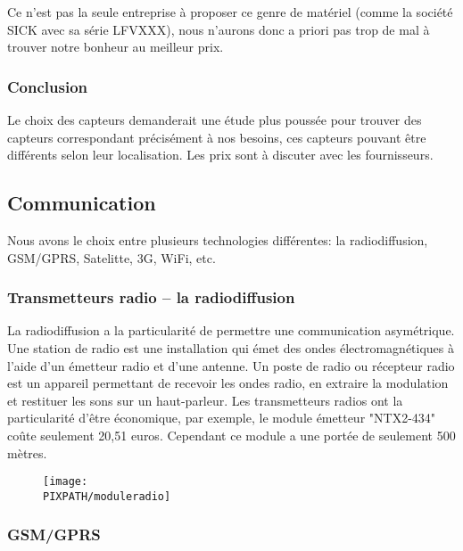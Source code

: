 \FloatBarrier

    Ce n'est pas la seule entreprise à proposer ce genre de matériel (comme la société SICK avec sa série LFVXXX), nous
    n'aurons donc a priori pas trop de mal à trouver notre bonheur au meilleur
    prix.

    \subsubsection{Conclusion}
    Le choix des capteurs demanderait une étude plus poussée
    pour trouver des capteurs correspondant précisément à nos besoins,
    ces capteurs pouvant être différents selon leur localisation.
    Les prix sont à discuter avec les fournisseurs.

\subsection{Communication}

Nous avons le choix entre plusieurs technologies différentes: la radiodiffusion, GSM/GPRS, Satelitte, 3G, WiFi, etc.

\subsubsection{Transmetteurs radio – la radiodiffusion}

La radiodiffusion a la particularité de permettre une communication asymétrique. 
Une station de radio est une installation qui émet des ondes électromagnétiques à l'aide d'un émetteur radio et d'une antenne. 
Un poste de radio ou récepteur radio est un appareil permettant de recevoir les ondes radio, en extraire la modulation et restituer les sons sur un haut-parleur.
Les transmetteurs radios ont la particularité d’être économique, par exemple, le module émetteur "NTX2-434" coûte seulement 20,51 euros. Cependant ce module a une portée de seulement 500 mètres.

    \begin{figure}[!h]
    \begin{center}
    \texttt{[image: \\PIXPATH/moduleradio]}
    \caption{}
    \end{center}
    \end{figure}

\subsubsection{GSM/GPRS}

